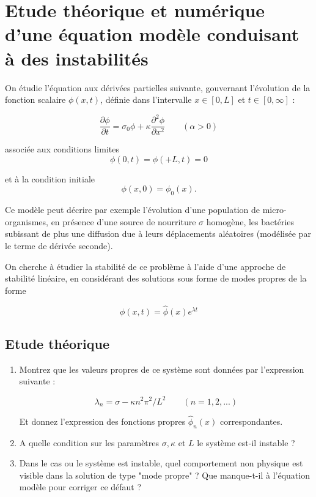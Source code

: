 \documentclass[a4paper,11pt]{article}
\begin{document}
\clearpage

\section{Etude théorique et numérique d'une équation modèle conduisant à des instabilités}


On étudie l'équation aux dérivées partielles suivante, 
gouvernant l'évolution de la fonction scalaire $\phi(x,t)$, définie dans l'intervalle $x\in [0,L]$ et $t\in [0,\infty]$ :

\begin{equation}
\frac{\partial \phi}{\partial t} =  \sigma_0 \phi + \kappa \frac{\partial^2 \phi}{\partial x^2}  
\quad \quad (\alpha >0)
\end{equation}

associée aux conditions limites 
$$\phi(0,t) = \phi(+L,t) = 0$$ 

et à la condition initiale $$\phi(x,0) = \phi_0(x).$$

Ce modèle peut décrire par exemple l'évolution d'une population de micro-organismes, en présence d'une source de nourriture $\sigma$ homogène, les bactéries subissant de plus une diffusion due à leurs déplacements aléatoires (modélisée par le terme de dérivée seconde).

On cherche à étudier la stabilité de ce problème à l'aide d'une approche de stabilité linéaire, en considérant des solutions sous forme de modes propres de la forme

$$
\phi(x,t) = \hat{\phi}(x) e^{\lambda t}
$$



\subsection{Etude théorique}

\begin{enumerate}

\item Montrez que les valeurs propres de ce système sont données par l'expression suivante :

$$
\lambda_n = \sigma - \kappa n^2 \pi^2 / L^2 \qquad ( n = 1,2,...) 
$$ 

Et donnez l'expression des fonctions propres $ \hat{\phi}_n(x)$ correspondantes.


\item A quelle condition sur les paramètres $\sigma, \kappa$ et $L$ le système est-il instable ?

\item Dans le cas ou le système est instable, quel comportement non physique est visible dans la solution de type "mode propre" ? Que manque-t-il à l'équation modèle pour corriger ce défaut ?

\end{enumerate}
\end{document}
